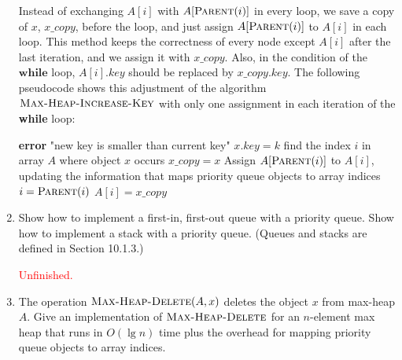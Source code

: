 \documentclass[12pt,reqno]{amsart}
\newif\ifanswer
\begin{document}
\begin{enumerate}[1.]
\ifanswer
{}
Instead of exchanging $A[i]$ with $A[\textsc{Parent}(i)]$ in every loop, we save a copy of $x$, $x\_copy$, before the loop, and just assign $A[\textsc{Parent}(i)]$ to $A[i]$ in each loop. This method keeps the correctness of every node except $A[i]$ after the last iteration, and we assign it with $x\_copy$. Also, in the condition of the $\textbf{while}$ loop, $A[i].key$ should be replaced by $x\_copy.key$. The following pseudocode shows this adjustment of the algorithm $\textsc{Max-Heap-Increase-Key}$ with only one assignment in each iteration of the \textbf{while} loop:
\begin{algorithm}
    \caption{$\textsc{Max-Heap-Increase-Key}(A, x, k)$}
    \begin{algorithmic}[1]
            \STATE \textbf{error} "new key is smaller than current key"
        \ENDIF
        \STATE $x.key = k$
        \STATE find the index $i$ in array $A$ where object $x$ occurs
        \STATE $x\_copy = x$
            \STATE Assign $A[\textsc{Parent}(i)]$ to $A[i]$, updating the information that maps priority queue objects to array indices
            \STATE $i = \textsc{Parent}(i)$
        \ENDWHILE
        \STATE $A[i] = x\_copy$
    \end{algorithmic}
\end{algorithm}
\vspace{1cm}
\newpage


\item Show how to implement a first-in, first-out queue with a priority queue. Show how to implement a stack with a priority queue. (Queues and stacks are defined in Section 10.1.3.)

\ifanswer
{}
\textcolor{red}{Unfinished.}
\vspace{1cm}



\item The operation $\textsc{Max-Heap-Delete}(A, x)$ deletes the object $x$ from max-heap $A$. Give an implementation of $\textsc{Max-Heap-Delete}$ for an $n$-element max heap that runs in $O(\lg{n})$ time plus the overhead for mapping priority queue objects to array indices.


\end{enumerate}
\end{document}
